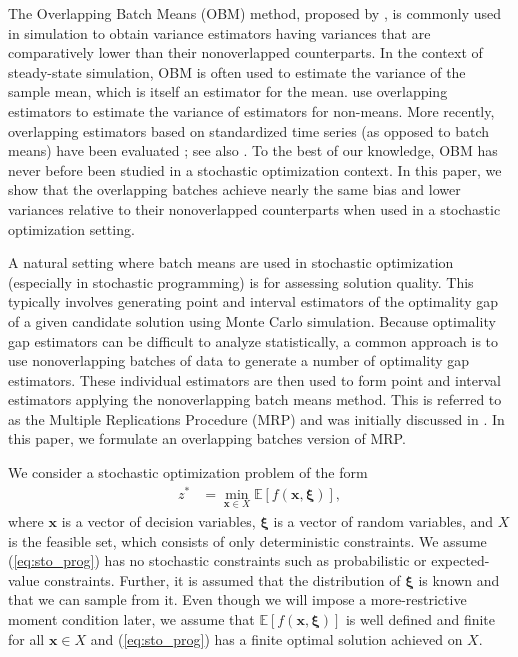 \documentclass[12pt]{article}
\newcommand{\e}[1]{\mathbb{E} \left[ #1 \right]
}
\newcommand{\x}{\mathbf{x}}
\newcommand{\xit}{\boldsymbol{\xi}}
\begin{document}
The Overlapping Batch Means (OBM) method, proposed by \citet{Meketon1984}, is commonly used in simulation to obtain variance estimators having variances that are comparatively lower than their nonoverlapped counterparts. 
In the context of steady-state simulation, OBM is often used to estimate the variance of the sample mean, which is itself an estimator for the mean. 
\cite{SAH90} use overlapping estimators to estimate the variance of estimators for non-means. 
More recently, overlapping estimators based on standardized time series (as opposed to batch means) have been evaluated \citep{Alexopoulos01012007,Alexopoulos2007}; see also \cite{Meterelliyoz_etal_12}.
To the best of our knowledge, OBM has never before been studied in a stochastic optimization context. 
In this paper, we show that the overlapping batches achieve nearly the same bias and lower variances relative to their nonoverlapped counterparts when used in a stochastic optimization setting.
  
A natural setting where batch means are used in stochastic optimization (especially in stochastic programming) is for assessing solution quality. 
This typically involves generating point and interval estimators of the optimality gap of a given candidate solution using Monte Carlo simulation. 
Because optimality gap estimators can be difficult to analyze statistically, a common approach is to use nonoverlapping batches of data to generate a number of optimality gap estimators. 
These individual estimators are then used to form point and interval estimators applying the nonoverlapping batch means method.
This is referred to as the Multiple Replications Procedure (MRP) and was initially discussed in \cite{Mak1999}.   
In this paper, we formulate an overlapping batches version of MRP.


We consider a stochastic optimization problem of the form 
\begin{align} \tag{SP} \label{eq:sto_prog} 
	z^* & = \min_{\x \in X} \e{f(\x,\xit)},
\end{align}
where $\x$ is a vector of decision variables, $\xit$ is a vector of random variables, and $X$ is the feasible set, which consists of only deterministic constraints. 
We assume (\ref{eq:sto_prog}) has no stochastic constraints such as probabilistic or expected-value constraints. 
Further, it is assumed that the distribution of $\xit$ is known and that we can sample from it.
Even though we will impose a more-restrictive moment condition later, we assume that $\e{f(\x,\xit)}$ is well defined and finite for all $\x \in X$ and (\ref{eq:sto_prog}) has a finite optimal solution achieved on $X$.
\end{document}
